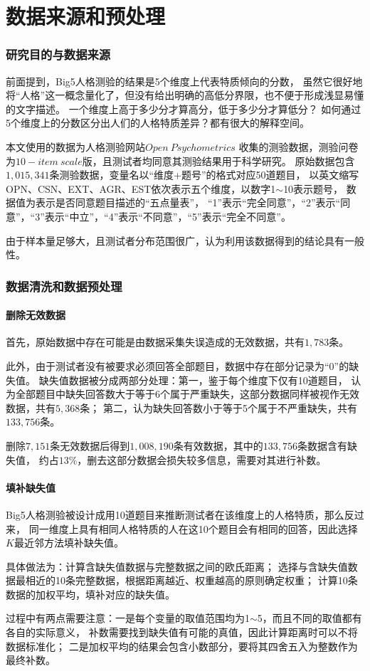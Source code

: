 \documentclass[UTF8]{ctexart}
\begin{document}
\part{数据来源和预处理}
\setcounter{section}{0}
\section{研究目的与数据来源}
前面提到，Big5人格测验的结果是5个维度上代表特质倾向的分数，
虽然它很好地将“人格”这一概念量化了，但没有给出明确的高低分界限，也不便于形成浅显易懂的文字描述。
一个维度上高于多少分才算高分，低于多少分才算低分？
如何通过5个维度上的分数区分出人们的人格特质差异？都有很大的解释空间。\par
本文使用的数据为人格测验网站\href{https://openpsychometrics.org}{$Open\ Psychometrics$}
收集的测验数据，测验问卷为$10-item\ scale$版，且测试者均同意其测验结果用于科学研究。
原始数据包含$1,015,341$条测验数据，变量名以“维度+题号”的格式对应50道题目，
以英文缩写OPN、CSN、EXT、AGR、EST依次表示五个维度，以数字1$\sim$10表示题号，
数据值为表示是否同意题目描述的“五点量表”，
“1”表示“完全同意”，“2”表示“同意”，“3”表示“中立”，“4”表示“不同意”，“5”表示“完全不同意”。\par
由于样本量足够大，且测试者分布范围很广，认为利用该数据得到的结论具有一般性。
\section{数据清洗和数据预处理}
\subsection*{删除无效数据}
首先，原始数据中存在可能是由数据采集失误造成的无效数据，共有$1,783$条。\par
此外，由于测试者没有被要求必须回答全部题目，数据中存在部分记录为“0”的缺失值。
缺失值数据被分成两部分处理：第一，鉴于每个维度下仅有10道题目，
认为全部题目中缺失回答数大于等于6个属于严重缺失，这部分数据同样被视作无效数据，共有$5,368$条；
第二，认为缺失回答数小于等于5个属于不严重缺失，共有$133,756$条。\par
删除$7,151$条无效数据后得到$1,008,190$条有效数据，其中的$133,756$条数据含有缺失值，
约占$13\%$，删去这部分数据会损失较多信息，需要对其进行补数。
\subsection*{填补缺失值}
Big5人格测验被设计成用10道题目来推断测试者在该维度上的人格特质，那么反过来，
同一维度上具有相同人格特质的人在这10个题目会有相同的回答，因此选择$K$最近邻方法填补缺失值。\par
具体做法为：计算含缺失值数据与完整数据之间的欧氏距离；
选择与含缺失值数据最相近的10条完整数据，根据距离越近、权重越高的原则确定权重；
计算10条数据的加权平均，填补对应的缺失值。\par
过程中有两点需要注意：一是每个变量的取值范围均为1$\sim$5，而且不同的取值都有各自的实际意义，
补数需要找到缺失值有可能的真值，因此计算距离时可以不将数据标准化；
二是加权平均的结果会包含小数部分，要将其四舍五入为整数作为最终补数。
\end{document}
